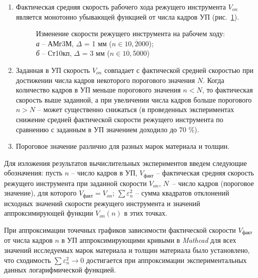 \begin{enumerate}
\item
Фактическая средняя скорость рабочего хода режущего инструмента
$V_{on}$
является монотонно убывающей функцией от числа кадров УП
(рис.~\ref{amg3m+10kp}).

\begin{figure}[p]
  \centering
  \caption{
    Изменение скорости режущего инструмента
    на рабочем ходу: \\
    {\it а} -- АМг3М, $\Delta$ = 1 мм ($n \in \overline{10,2000}$); \\
    {\it б} -- Ст10кп, $\Delta$ = 3 мм ($n \in \overline{10,5000}$)
  }
  \label{amg3m+10kp}
\end{figure}

\item
Заданная в УП скорость
$V_{on}$
совпадает с фактической средней скоростью
при достижении числа кадров некоторого порогового значения $N$.
Когда количество кадров в УП меньше порогового значения $n<N$,
то фактическая скорость выше заданной,
а при увеличении числа кадров больше порогового $n>N$
-- может существенно снижаться
(в проведенных экспериментах снижение средней
фактической скорости режущего инструмента по сравнению
с заданным в УП значением доходило до 70 \%).

\item
Пороговое значение различно для разных марок материала и толщин.

\end{enumerate}

Для изложения результатов вычислительных экспериментов
введем следующие обозначения:
пусть
$n$ -- число кадров в УП,
$V_\text{факт}$ -- фактическая средняя скорость режущего инструмента при заданной скорости $V_{on}$,
$N$~-- число кадров (пороговое значение), для которого $V_\text{факт}=V_{on}$;
$\sum \varepsilon_n^2$ -- сумма квадратов отклонений исходных значений
скорости режущего инструмента и значений аппроксимирующей функции $V_{on}(n)$
в этих точках.

При аппроксимации точечных графиков
зависимости фактической скорости
$V_\text{факт}$
от числа кадров $n$
в УП аппроксимирующими кривыми в
{\it Mathcad}
для всех значений исследуемых марок материала и толщин материала было установлено,
что сходимость
$\sum \varepsilon_n^2 \to 0$
достигается при аппроксимации экспериментальных данных логарифмической функцией.

